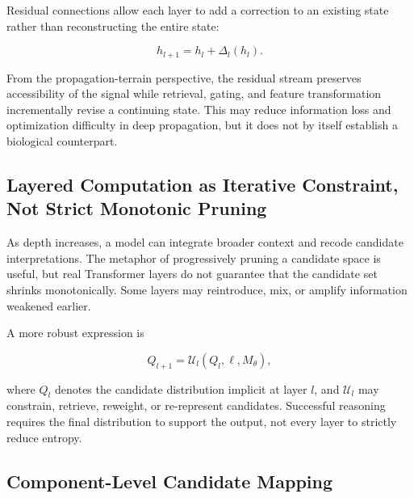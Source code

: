 \documentclass[11pt, a4paper]{article}
\begin{document}
Residual connections allow each layer to add a correction to an existing state rather than reconstructing the entire state:


\[
h_{l+1}=h_l+\Delta_l(h_l).
\tag{12}
\]

From the propagation-terrain perspective, the residual stream preserves accessibility of the signal while retrieval, gating, and feature transformation incrementally revise a continuing state. This may reduce information loss and optimization difficulty in deep propagation, but it does not by itself establish a biological counterpart.


\subsection{Layered Computation as Iterative Constraint, Not Strict Monotonic Pruning}


As depth increases, a model can integrate broader context and recode candidate interpretations. The metaphor of progressively pruning a candidate space is useful, but real Transformer layers do not guarantee that the candidate set shrinks monotonically. Some layers may reintroduce, mix, or amplify information weakened earlier.


A more robust expression is


\[
Q_{l+1}
=
\mathcal{U}_l(Q_l,\ell,M_\theta),
\tag{13}
\]

where $Q_l$ denotes the candidate distribution implicit at layer $l$, and $\mathcal{U}_l$ may constrain, retrieve, reweight, or re-represent candidates. Successful reasoning requires the final distribution to support the output, not every layer to strictly reduce entropy.


\subsection{Component-Level Candidate Mapping}
\end{document}

